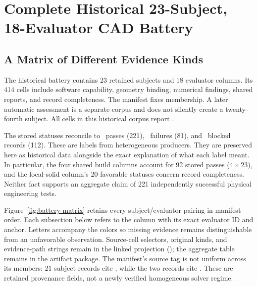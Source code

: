 
\section{Complete Historical 23-Subject, 18-Evaluator CAD Battery}
\label{sup:battery-matrix}

\subsection{A Matrix of Different Evidence Kinds}
The historical battery contains 23 retained subjects and 18 evaluator columns. Its 414 cells include software capability, geometry binding, numerical findings, shared reports, and record completeness. The manifest fixes membership. A later automatic assessment is a separate corpus and does not silently create a twenty-fourth subject. All cells in this historical corpus report .

The stored statuses reconcile to \BatteryPass\ passes (221), \BatteryFail\ failures (81), and \BatteryBlocked\ blocked records (112). These are labels from heterogeneous producers. They are preserved here as historical data alongside the exact explanation of what each label meant. In particular, the four shared build columns account for 92 stored passes ($4 \times 23$), and the local-solid column's 20 favorable statuses concern record completeness. Neither fact supports an aggregate claim of 221 independently successful physical engineering tests.

Figure~\ref{fig:battery-matrix} retains every subject/evaluator pairing in manifest order. Each subsection below refers to the column with its exact evaluator ID and  anchor. Letters accompany the colors so missing evidence remains distinguishable from an unfavorable observation. Source-cell selectors, original kinds, and evidence-path strings remain in the linked projection (); the aggregate table remains in the artifact package. The manifest's source tag is not uniform across its members: 21 subject records cite , while the two  records cite . These are retained provenance fields, not a newly verified homogeneous solver regime.

